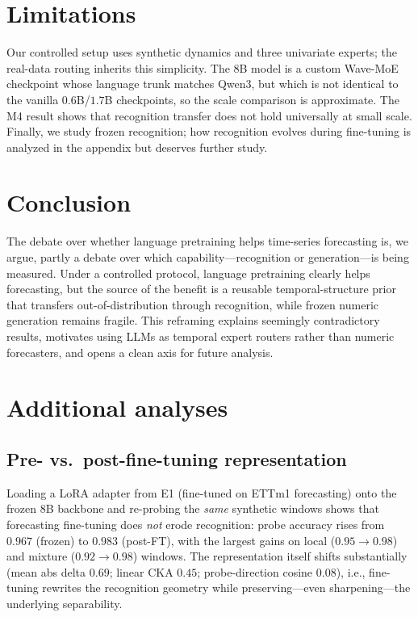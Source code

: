 \documentclass{article}
\begin{document}
\section{Limitations}\label{sec:limits}

Our controlled setup uses synthetic dynamics and three univariate experts; the
real-data routing inherits this simplicity.  The $8$B model is a custom
Wave-MoE checkpoint whose language trunk matches Qwen3, but which is not
identical to the vanilla $0.6$B/$1.7$B checkpoints, so the scale comparison is
approximate.  The M4 result shows that recognition transfer does not hold
universally at small scale.  Finally, we study frozen recognition; how
recognition evolves during fine-tuning is analyzed in the appendix but deserves
further study.

\section{Conclusion}\label{sec:conclusion}

The debate over whether language pretraining helps time-series forecasting is,
we argue, partly a debate over which capability---recognition or
generation---is being measured.  Under a controlled protocol, language
pretraining clearly helps forecasting, but the source of the benefit is a
reusable temporal-structure prior that transfers out-of-distribution through
recognition, while frozen numeric generation remains fragile.  This reframing
explains seemingly contradictory results, motivates using LLMs as temporal
expert routers rather than numeric forecasters, and opens a clean axis for
future analysis.




\appendix
\section{Additional analyses}\label{app:extra}

\subsection{Pre- vs.\ post-fine-tuning representation}
\label{app:prepost}
Loading a LoRA adapter from E1 (fine-tuned on ETTm1 forecasting) onto the
frozen $8$B backbone and re-probing the \emph{same} synthetic windows shows
that forecasting fine-tuning does \emph{not} erode recognition: probe accuracy
rises from $0.967$ (frozen) to $0.983$ (post-FT), with the largest gains on
local ($0.95{\to}0.98$) and mixture ($0.92{\to}0.98$) windows.  The
representation itself shifts substantially (mean abs delta $0.69$; linear CKA
$0.45$; probe-direction cosine $0.08$), i.e., fine-tuning rewrites the
recognition geometry while preserving---even sharpening---the underlying
separability.
\end{document}
